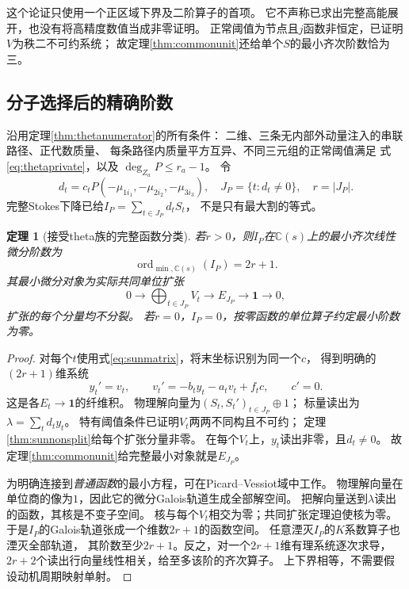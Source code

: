 \documentclass[11pt,a4paper]{ctexart}
\theoremstyle{cnplain}\newtheorem{theorem}{定理}[section]
\theoremstyle{definition}\newtheorem{definition}[theorem]{定义}
\theoremstyle{remark}\newtheorem{remark}[theorem]{注}
\begin{document}
这个论证只使用一个正区域下界及二阶算子的首项。
它不声称已求出完整高能展开，也没有将高精度数值当成非零证明。
正常阈值为节点且$j$函数非恒定，已证明$V$为秩二不可约系统；
故定理\ref{thm:commonunit}还给单个$S$的最小齐次阶数恰为三。

\subsection{分子选择后的精确阶数}
沿用定理\ref{thm:thetanumerator}的所有条件：
二维、三条无内部外动量注入的串联路径、正代数质量、
每条路径内质量平方互异、不同三元组的正常阈值满足
式\eqref{eq:thetaprivate}，以及
$\deg_{Z_a}P\le r_a-1$。
令
\[
 d_t=c_tP(-\mu_{1i_1},-\mu_{2i_2},-\mu_{3i_3}),\quad
 J_P=\{t:d_t\ne0\},\quad r=|J_P|.
\]
完整Stokes下降已给$I_P=\sum_{t\in J_P}d_tS_t$，
不是只有最大割的等式。

\begin{theorem}[接受theta族的完整函数分类]\label{thm:thetaexactorder}
若$r>0$，则$I_P$在$\mathbb C(s)$上的最小齐次线性微分阶数为
\begin{equation}\label{eq:thetaexactorder}
 \boxed{\operatorname{ord}_{\min,\mathbb C(s)}(I_P)=2r+1.}
\end{equation}
其最小微分对象为实际共同单位扩张
\begin{equation}\label{eq:thetamixed}
 0\longrightarrow\bigoplus_{t\in J_P}V_t
 \longrightarrow E_{J_P}\longrightarrow\mathbf1\longrightarrow0 ,
\end{equation}
扩张的每个分量均不分裂。
若$r=0$，$I_P=0$，按零函数的单位算子约定最小阶数为零。
\end{theorem}
\begin{proof}
对每个$t$使用式\eqref{eq:sunmatrix}，将末坐标识别为同一个$c$，
得到明确的$(2r+1)$维系统
\[
 y_t'=v_t,\qquad
 v_t'=-b_t y_t-a_t v_t+f_tc,\qquad c'=0.
\]
这是各$E_t\to\mathbf1$的纤维积。
物理解向量为$(S_t,S_t')_{t\in J_P}\oplus1$；
标量读出为$\lambda=\sum_td_ty_t$。
特有阈值条件已证明$V_t$两两不同构且不可约；
定理\ref{thm:sunnonsplit}给每个扩张分量非零。
在每个$V_t$上，$y_t$读出非零，且$d_t\ne0$。
故定理\ref{thm:commonunit}给完整最小对象就是$E_{J_P}$。

为明确连接到\emph{普通函数}的最小方程，可在Picard--Vessiot域中工作。
物理解向量在单位商的像为$1$，因此它的微分Galois轨道生成全部解空间。
把解向量送到$\lambda$读出的函数，其核是不变子空间。
核与每个$V_t$相交为零；共同扩张定理迫使核为零。
于是$I_P$的Galois轨道张成一个维数$2r+1$的函数空间。
任意湮灭$I_P$的$K$系数算子也湮灭全部轨道，
其阶数至少$2r+1$。反之，对一个$2r+1$维有理系统逐次求导，
$2r+2$个读出行向量线性相关，给至多该阶的齐次算子。
上下界相等，不需要假设动机周期映射单射。
\end{proof}
\end{document}
